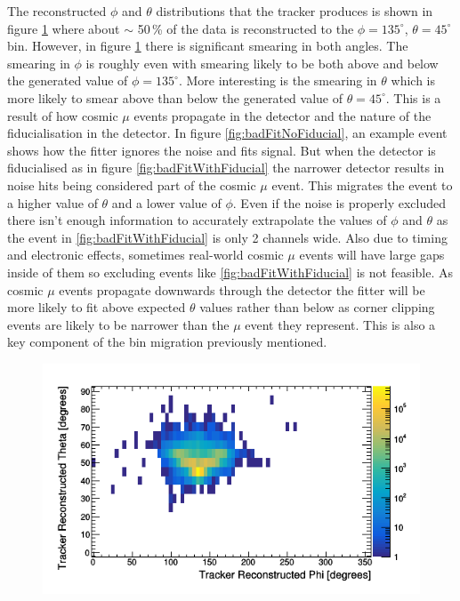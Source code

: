 The reconstructed $\phi$ and $\theta$ distributions that the tracker produces is shown in figure \ref{fig:pVsTWithDeadLog} where about $\sim$ 50\,\% of the data is reconstructed to the $\phi = 135^\circ$, $\theta = 45^\circ$ bin. However, in figure \ref{fig:pVsTWithDeadLog} there is significant smearing in both angles. The smearing in $\phi$ is roughly even with smearing likely to be both above and below the generated value of $\phi = 135^\circ$. More interesting is the smearing in $\theta$ which is more likely to smear above than below the generated value of $\theta = 45^\circ$. This is a result of how cosmic $\mu$ events propagate in the detector and the nature of the fiducialisation in the detector. In figure \ref{fig:badFitNoFiducial}, an example event shows how the fitter ignores the noise and fits signal. But when the detector is fiducialised as in figure \ref{fig:badFitWithFiducial} the narrower detector results in noise hits being considered part of the cosmic $\mu$ event. This migrates the event to a higher value of $\theta$ and a lower value of $\phi$. Even if the noise is properly excluded there isn't enough information to accurately extrapolate the values of $\phi$ and $\theta$ as the event in \ref{fig:badFitWithFiducial} is only 2 channels wide. Also due to timing and electronic effects, sometimes real-world cosmic $\mu$ events will have large gaps inside of them so excluding events like \ref{fig:badFitWithFiducial} is not feasible. As cosmic $\mu$ events propagate downwards through the detector the fitter will be more likely to fit above expected $\theta$ values rather than below as corner clipping events are likely to be narrower than the $\mu$ event they represent. This is also a key component of the bin migration previously mentioned. 

\begin{figure}[!h]
 \centering
 \includegraphics[width=0.7\linewidth]{Chapter5/Figs/cosmicTrackerUncertainties/pVsTWithDeadLog.png}
 \label{fig:pVsTWithDeadLog}
\end{figure}

